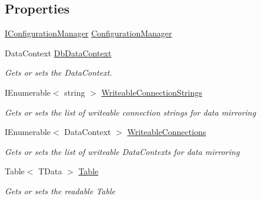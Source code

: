 \subsection*{Properties}
\begin{DoxyCompactItemize}
\item 
\hyperlink{interfaceCqrs_1_1Configuration_1_1IConfigurationManager}{I\+Configuration\+Manager} \hyperlink{classCqrs_1_1DataStores_1_1SqlDataStore_a9d720406a3c3abbd8bf1924bd81874ac}{Configuration\+Manager}
\item 
Data\+Context \hyperlink{classCqrs_1_1DataStores_1_1SqlDataStore_aa944d65b800ad9ba7809e96ed2b86f26}{Db\+Data\+Context}
\begin{DoxyCompactList}\small\item\em Gets or sets the Data\+Context. \end{DoxyCompactList}\item 
I\+Enumerable$<$ string $>$ \hyperlink{classCqrs_1_1DataStores_1_1SqlDataStore_adfdf7101f6c644f4b4ad074a2edf0a42}{Writeable\+Connection\+Strings}
\begin{DoxyCompactList}\small\item\em Gets or sets the list of writeable connection strings for data mirroring \end{DoxyCompactList}\item 
I\+Enumerable$<$ Data\+Context $>$ \hyperlink{classCqrs_1_1DataStores_1_1SqlDataStore_af37a59f184ce77c2204834e60c8f76aa}{Writeable\+Connections}
\begin{DoxyCompactList}\small\item\em Gets or sets the list of writeable Data\+Contexts for data mirroring \end{DoxyCompactList}\item 
Table$<$ T\+Data $>$ \hyperlink{classCqrs_1_1DataStores_1_1SqlDataStore_abcd0a88f984a275880f402baadaae2c7}{Table}
\begin{DoxyCompactList}\small\item\em Gets or sets the readable Table \end{DoxyCompactList}\item 

\end{DoxyCompactItemize}
